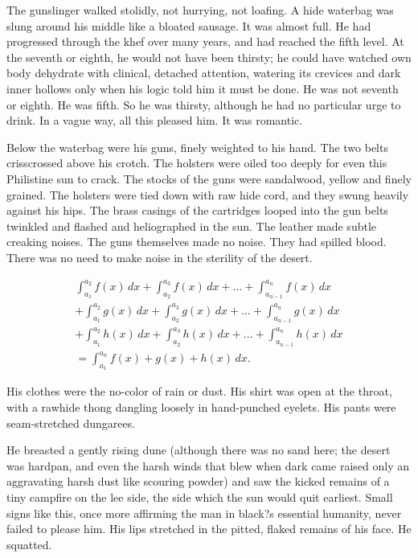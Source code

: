 \documentclass[
11pt,%
tightenlines,%
twoside,%
onecolumn,%
nofloats,%
nobibnotes,%
nofootinbib,%
superscriptaddress,%
noshowpacs,%
centertags]%
{revtex4}
\begin{document}
The gunslinger walked stolidly, not hurrying, not loafing. A hide waterbag was slung around his middle like a bloated sausage. It was almost full. He had progressed through the khef over many years, and had reached the fifth level. At the seventh or eighth, he would not have been thirsty; he could have watched own body dehydrate with clinical, detached attention, watering its crevices and dark inner hollows only when his logic told him it must be done. He was not seventh or eighth. He was fifth. So he was thirsty, although he had no particular urge to drink. In a vague way, all this pleased him. It was romantic.

Below the waterbag were his guns, finely weighted to his hand. The two belts crisscrossed above his crotch. The holsters were oiled too deeply for even this Philistine sun to crack. The stocks of the guns were sandalwood, yellow and finely grained. The holsters were tied down with raw hide cord, and they swung heavily against his hips. The brass casings of the cartridges looped into the gun belts twinkled and flashed and heliographed in the sun. The leather made subtle creaking noises. The guns themselves made no noise. They had spilled blood. There was no need to make noise in the sterility of the desert.

\begin{multline}
\int_{a_1}^{a_2} f(x)\,dx+\int_{a_2}^{a_3} f(x)\,dx
+\dots+\int_{a_{n-1}}^{a_n} f(x)\,dx\\
+\int_{a_1}^{a_2} g(x)\,dx+\int_{a_2}^{a_3} g(x)\,dx
+\dots+\int_{a_{n-1}}^{a_n} g(x)\,dx\\
+\int_{a_1}^{a_2} h(x)\,dx+\int_{a_2}^{a_3} h(x)\,dx
+\dots+\int_{a_{n-1}}^{a_n} h(x)\,dx\\
=\int_{a_1}^{a_n} f(x)+g(x)+h(x)\,dx.
\end{multline}

His clothes were the no-color of rain or dust. His shirt was open at the throat, with a rawhide thong dangling loosely in hand-punched eyelets. His pants were seam-stretched dungarees.

He breasted a gently rising dune (although there was no sand here; the desert was hardpan, and even the harsh winds that blew when dark came raised only an aggravating harsh dust like scouring powder) and saw the kicked remains of a tiny campfire on the lee side, the side which the sun would quit earliest. Small signs like this, once more affirming the man in black?s essential humanity, never failed to please him. His lips stretched in the pitted, flaked remains of his face. He squatted.
\end{document}
